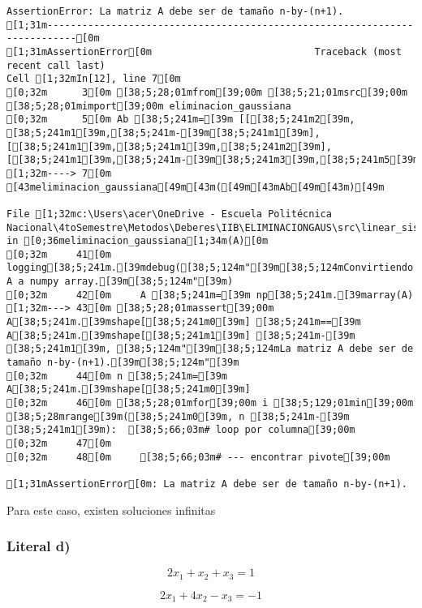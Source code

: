 \documentclass[
  letterpaper,
  DIV=11,
  numbers=noendperiod]{scrartcl}
\begin{document}
\begin{verbatim}
AssertionError: La matriz A debe ser de tamaño n-by-(n+1).
[1;31m---------------------------------------------------------------------------[0m
[1;31mAssertionError[0m                            Traceback (most recent call last)
Cell [1;32mIn[12], line 7[0m
[0;32m      3[0m [38;5;28;01mfrom[39;00m [38;5;21;01msrc[39;00m [38;5;28;01mimport[39;00m eliminacion_gaussiana
[0;32m      5[0m Ab [38;5;241m=[39m [[[38;5;241m2[39m, [38;5;241m1[39m,[38;5;241m-[39m[38;5;241m1[39m], [[38;5;241m1[39m,[38;5;241m1[39m,[38;5;241m2[39m],[[38;5;241m1[39m,[38;5;241m-[39m[38;5;241m3[39m,[38;5;241m5[39m]]
[1;32m----> 7[0m [43meliminacion_gaussiana[49m[43m([49m[43mAb[49m[43m)[49m

File [1;32mc:\Users\acer\OneDrive - Escuela Politécnica Nacional\4toSemestre\Metodos\Deberes\IIB\ELIMINACIONGAUS\src\linear_sist_methods.py:43[0m, in [0;36meliminacion_gaussiana[1;34m(A)[0m
[0;32m     41[0m     logging[38;5;241m.[39mdebug([38;5;124m"[39m[38;5;124mConvirtiendo A a numpy array.[39m[38;5;124m"[39m)
[0;32m     42[0m     A [38;5;241m=[39m np[38;5;241m.[39marray(A)
[1;32m---> 43[0m [38;5;28;01massert[39;00m A[38;5;241m.[39mshape[[38;5;241m0[39m] [38;5;241m==[39m A[38;5;241m.[39mshape[[38;5;241m1[39m] [38;5;241m-[39m [38;5;241m1[39m, [38;5;124m"[39m[38;5;124mLa matriz A debe ser de tamaño n-by-(n+1).[39m[38;5;124m"[39m
[0;32m     44[0m n [38;5;241m=[39m A[38;5;241m.[39mshape[[38;5;241m0[39m]
[0;32m     46[0m [38;5;28;01mfor[39;00m i [38;5;129;01min[39;00m [38;5;28mrange[39m([38;5;241m0[39m, n [38;5;241m-[39m [38;5;241m1[39m):  [38;5;66;03m# loop por columna[39;00m
[0;32m     47[0m 
[0;32m     48[0m     [38;5;66;03m# --- encontrar pivote[39;00m

[1;31mAssertionError[0m: La matriz A debe ser de tamaño n-by-(n+1).
\end{verbatim}

Para este caso, existen soluciones infinitas

\subsubsection{Literal d)}\label{literal-d}

\[2x_1 + x_2 + x_3 = 1\]

\[2x_1 + 4x_2 - x_3= -1\]
\end{document}

